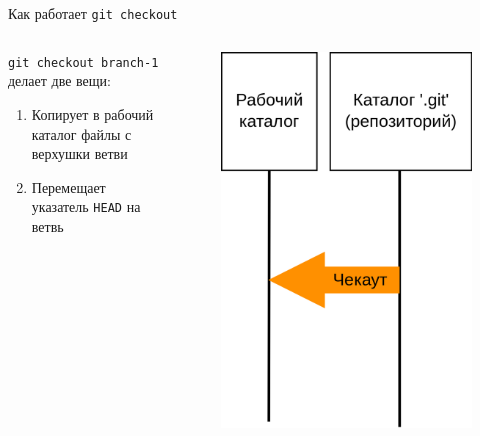\documentclass[presentation]{beamer}
\begin{document}
\begin{frame}[fragile]{Как работает \texttt{git checkout}}
  \begin{columns}
    \begin{column}{.6\textwidth}
      \texttt{git checkout branch-1} делает две вещи:
      \begin{enumerate}
      \item Копирует в рабочий каталог файлы с верхушки ветви
      \item Перемещает указатель \texttt{HEAD} на ветвь
      \end{enumerate}
    \end{column}
      \begin{column}{.4\textwidth}
        \begin{figure}[htb]
          \centering
          \includegraphics[height=.7\textheight]{git-operation-checkout-file}
        \end{figure}
      \end{column}
    \end{columns}
\end{frame}
\end{document}

